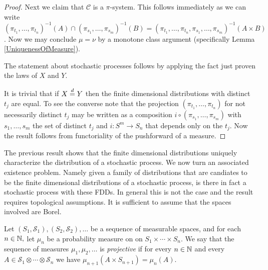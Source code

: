 \begin{proof}
Next we claim that $\mathcal{C}$ is a $\pi$-system.  This follows
immediately as we can write $(\pi_{t_1},\dotsc, \pi_{t_n})^{-1}(A)
\cap (\pi_{s_1},\dotsc, \pi_{s_m})^{-1}(B) = (\pi_{t_1},\dotsc,
\pi_{t_n}, \pi_{s_1},\dotsc, \pi_{s_m})^{-1}(A \times B)$.  Now we may
conclude $\mu = \nu$
by a monotone class argument (specifically Lemma \ref{UniquenessOfMeasure}).

The statement about stochastic processes follows by applying the fact just proven the laws
of $X$ and $Y$.

It is trivial that if $X \overset{d}= Y$ then the finite dimensional
distributions with distinct $t_j$ are equal.  To see the converse note
that the projection $(\pi_{t_1},\dotsc,  \pi_{t_n})$ for not necessarily distinct $t_j$ may be written
as a composition $i \circ (\pi_{s_1}, \dotsc, \pi_{s_m})$ with $s_1,
\dotsc, s_m$ the set of distinct $t_j$ and $i : S^m \to S_n$ that
depends only on the $t_j$.  Now the result follows from functoriality
of the pushforward of a measure.
\end{proof}

The previous result shows that the finite dimensional distributions
uniquely characterize the distribution of a stochastic process.  We
now turn an associated existence problem.  Namely given a family of
distributions that are candiates to be the finite dimensional
distributions of a stochastic process, is there in fact a stochastic
process with these FDDs.  In general this is not the case and the
result requires topological assumptions.  It is sufficient to assume
that the spaces involved are Borel.

\begin{defn}Let $(S_1, \mathcal{S}_1), (S_2, \mathcal{S}_2), \dotsc$ be a sequence of measurable spaces,
  and for each $n \in \mathbb{N}, $ let  $\mu_n$ be a probability
  measure on on $S_1 \times \dotsb \times S_n$.  We say that the
  sequence of measures $\mu_1, \mu_2, \dotsc$ is \emph{projective} if
  for every $n \in \mathbb{N}$ and every $A \in \mathcal{S}_1 \otimes
  \dotsb \otimes \mathcal{S}_n$ we have $\mu_{n+1}(A \times S_{n+1}) =
  \mu_n(A)$.
\end{defn}

